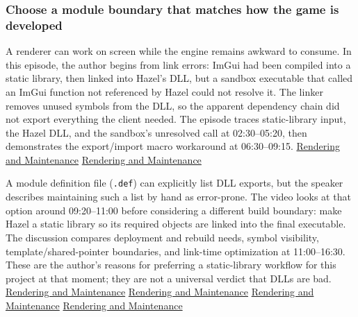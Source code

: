 \subsubsection{Choose a module boundary that matches how the game is developed}\label{choose-a-module-boundary-that-matches-how-the-game-is-developed}

A renderer can work on screen while the engine remains awkward to consume. In this episode, the author begins from link errors: ImGui had been compiled into a static library, then linked into Hazel's DLL, but a sandbox executable that called an ImGui function not referenced by Hazel could not resolve it. The linker removes unused symbols from the DLL, so the apparent dependency chain did not export everything the client needed. The episode traces static-library input, the Hazel DLL, and the sandbox's unresolved call at 02:30--05:20, then demonstrates the export/import macro workaround at 06:30--09:15. \href{https://www.youtube.com/watch?v=695SyEyFwWU&t=150s}{Rendering and Maintenance} \href{https://www.youtube.com/watch?v=695SyEyFwWU&t=390s}{Rendering and Maintenance}

A module definition file (\texttt{.def}) can explicitly list DLL exports, but the speaker describes maintaining such a list by hand as error-prone. The video looks at that option around 09:20--11:00 before considering a different build boundary: make Hazel a static library so its required objects are linked into the final executable. The discussion compares deployment and rebuild needs, symbol visibility, template/shared-pointer boundaries, and link-time optimization at 11:00--16:30. These are the author's reasons for preferring a static-library workflow for this project at that moment; they are not a universal verdict that DLLs are bad. \href{https://www.youtube.com/watch?v=695SyEyFwWU&t=550s}{Rendering and Maintenance} \href{https://www.youtube.com/watch?v=695SyEyFwWU&t=660s}{Rendering and Maintenance} \href{https://www.youtube.com/watch?v=695SyEyFwWU&t=780s}{Rendering and Maintenance} \href{https://www.youtube.com/watch?v=695SyEyFwWU&t=930s}{Rendering and Maintenance}

